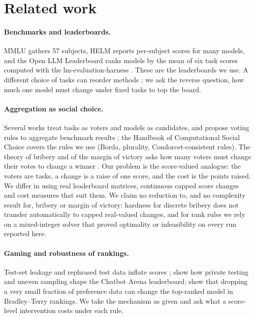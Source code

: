 \section{Related work}
\paragraph{Benchmarks and leaderboards.}
MMLU \citep{hendrycks2021measuring} gathers 57 subjects, HELM \citep{liang2022holistic} reports per-subject scores for many models, and the Open LLM Leaderboard ranks models by the mean of six task scores computed with the lm-evaluation-harness \citep{gao2023harness}. These are the leaderboards we use. A different choice of tasks can reorder methods \citep{dehghani2021lottery}; we ask the reverse question, how much one model must change under fixed tasks to top the board.

\paragraph{Aggregation as social choice.}
Several works treat tasks as voters and models as candidates, and propose voting rules to aggregate benchmark results \citep{lanctot2023social,rofin2023votenrank}; the Handbook of Computational Social Choice \citep{brandt2016handbook} covers the rules we use (Borda, plurality, Condorcet-consistent rules). The theory of bribery and of the margin of victory asks how many voters must change their votes to change a winner \citep{faliszewski2009bribery,xia2012margin}. Our problem is the score-valued analogue: the voters are tasks, a change is a raise of one score, and the cost is the points raised. We differ in using real leaderboard matrices, continuous capped score changes and cost measures that suit them. We claim no reduction to, and no complexity result for, bribery or margin of victory: hardness for discrete bribery does not transfer automatically to capped real-valued changes, and for rank rules we rely on a mixed-integer solver that proved optimality or infeasibility on every run reported here.

\paragraph{Gaming and robustness of rankings.}
Test-set leakage and rephrased test data inflate scores \citep{zhou2023dont,yang2023rephrased}; \citet{singh2025illusion} show how private testing and uneven sampling shape the Chatbot Arena leaderboard; \citet{huang2025dropping} show that dropping a very small fraction of preference data can change the top-ranked model in Bradley--Terry rankings. We take the mechanism as given and ask what a score-level intervention costs under each rule.


